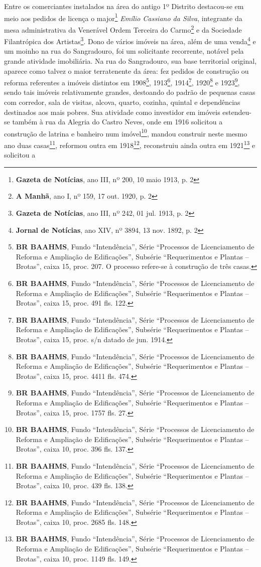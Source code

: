 Entre os comerciantes instalados na área do antigo 1º Distrito destacou-se em meio aos pedidos de licença o major\footnote{\textbf{Gazeta de Notícias}, ano III, nº 200, 10 maio 1913, p. 2} \textit{Emílio Cassiano da Silva}, integrante da mesa administrativa da Venerável Ordem Terceira do Carmo\footnote{\textbf{A Manhã}, ano I, nº 159, 17 out. 1920, p. 2} e da Sociedade Filantrópica dos Artistas\footnote{\textbf{Gazeta de Notícias}, ano III, nº 242, 01 jul. 1913, p. 2}. Dono de vários imóveis na área, além de uma venda\footnote{\textbf{Jornal de Notícias}, ano XIV, nº 3894, 13 nov. 1892, p. 2} e um moinho \cite[p.~433]{reis_almanak_1898} na rua do Sangradouro, foi um solicitante recorrente, notável pela grande atividade imobiliária. Na rua do Sangradouro, sua base territorial original, aparece como talvez o maior terratenente da área: fez pedidos de construção ou reforma referentes a imóveis distintos em 1908\footnote{\textbf{BR BAAHMS}, Fundo ``Intendência'', Série ``Processos de Licenciamento de Reforma e Ampliação de Edificações'', Subsérie ``Requerimentos e Plantas -- Brotas'', caixa 15, proc. 207. O processo refere-se à construção de três casas.}, 1913\footnote{\textbf{BR BAAHMS}, Fundo ``Intendência'', Série ``Processos de Licenciamento de Reforma e Ampliação de Edificações'', Subsérie ``Requerimentos e Plantas -- Brotas'', caixa 15, proc. 491 fls. 122.}, 1914\footnote{\textbf{BR BAAHMS}, Fundo ``Intendência'', Série ``Processos de Licenciamento de Reforma e Ampliação de Edificações'', Subsérie ``Requerimentos e Plantas -- Brotas'', caixa 15, proc. s/n datado de jun. 1914.}, 1920\footnote{\textbf{BR BAAHMS}, Fundo ``Intendência'', Série ``Processos de Licenciamento de Reforma e Ampliação de Edificações'', Subsérie ``Requerimentos e Plantas -- Brotas'', caixa 15, proc. 4411 fls. 474.} e 1923\footnote{\textbf{BR BAAHMS}, Fundo ``Intendência'', Série ``Processos de Licenciamento de Reforma e Ampliação de Edificações'', Subsérie ``Requerimentos e Plantas -- Brotas'', caixa 15, proc. 1757 fls. 27.}, sendo tais imóveis relativamente grandes, destoando do padrão de pequenas casas com corredor, sala de visitas, alcova, quarto, cozinha, quintal e dependências destinados aos mais pobres. Sua atividade como investidor em imóveis estendeu-se também à rua da Alegria do Castro Neves, onde em 1916 solicitou a construção de latrina e banheiro num imóvel\footnote{\textbf{BR BAAHMS}, Fundo ``Intendência'', Série ``Processos de Licenciamento de Reforma e Ampliação de Edificações'', Subsérie ``Requerimentos e Plantas -- Brotas'', caixa 10, proc. 396 fls. 137.}, mandou construir neste mesmo ano duas casas\footnote{\textbf{BR BAAHMS}, Fundo ``Intendência'', Série ``Processos de Licenciamento de Reforma e Ampliação de Edificações'', Subsérie ``Requerimentos e Plantas -- Brotas'', caixa 10, proc. 439 fls. 138.}, reformou outra em 1918\footnote{\textbf{BR BAAHMS}, Fundo ``Intendência'', Série ``Processos de Licenciamento de Reforma e Ampliação de Edificações'', Subsérie ``Requerimentos e Plantas -- Brotas'', caixa 10, proc. 2685 fls. 148.}, reconstruiu ainda outra em 1921\footnote{\textbf{BR BAAHMS}, Fundo ``Intendência'', Série ``Processos de Licenciamento de Reforma e Ampliação de Edificações'', Subsérie ``Requerimentos e Plantas -- Brotas'', caixa 10, proc. 1149 fls. 149.} e solicitou a 
